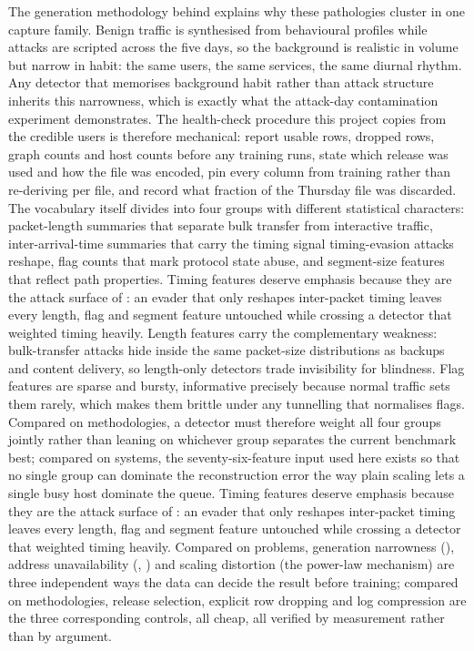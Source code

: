 The generation methodology behind \cite{k5} explains why these pathologies cluster in one capture family. Benign traffic is synthesised from behavioural profiles while attacks are scripted across the five days, so the background is realistic in volume but narrow in habit: the same users, the same services, the same diurnal rhythm. Any detector that memorises background habit rather than attack structure inherits this narrowness, which is exactly what the attack-day contamination experiment demonstrates. The health-check procedure this project copies from the credible \cite{k5} users is therefore mechanical: report usable rows, dropped rows, graph counts and host counts before any training runs, state which release was used and how the file was encoded, pin every column from training rather than re-deriving per file, and record what fraction of the Thursday file was discarded. The vocabulary itself divides into four groups with different statistical characters: packet-length summaries that separate bulk transfer from interactive traffic, inter-arrival-time summaries that carry the timing signal timing-evasion attacks reshape, flag counts that mark protocol state abuse, and segment-size features that reflect path properties. Timing features deserve emphasis because they are the attack surface of \cite{k32}: an evader that only reshapes inter-packet timing leaves every length, flag and segment feature untouched while crossing a detector that weighted timing heavily. Length features carry the complementary weakness: bulk-transfer attacks hide inside the same packet-size distributions as backups and content delivery, so length-only detectors trade invisibility for blindness. Flag features are sparse and bursty, informative precisely because normal traffic sets them rarely, which makes them brittle under any tunnelling that normalises flags. Compared on methodologies, a detector must therefore weight all four groups jointly rather than leaning on whichever group separates the current benchmark best; compared on systems, the seventy-six-feature input used here exists so that no single group can dominate the reconstruction error the way plain scaling lets a single busy host dominate the queue. Timing features deserve emphasis because they are the attack surface of \cite{k32}: an evader that only reshapes inter-packet timing leaves every length, flag and segment feature untouched while crossing a detector that weighted timing heavily. Compared on problems, generation narrowness (\cite{k5}), address unavailability (\cite{k5}, \cite{k6}) and scaling distortion (the power-law mechanism) are three independent ways the data can decide the result before training; compared on methodologies, release selection, explicit row dropping and log compression are the three corresponding controls, all cheap, all verified by measurement rather than by argument.


